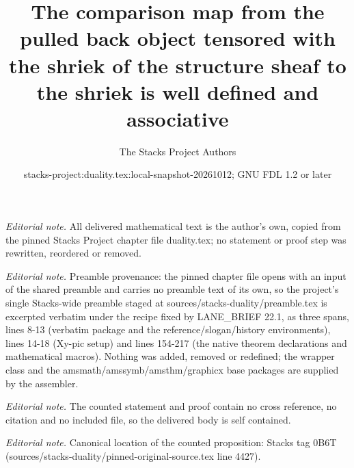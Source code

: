 \documentclass[10pt,a4paper]{amsart}
\title{The comparison map from the pulled back object tensored with the shriek of the structure sheaf to the shriek is well defined and associative}
\author{The Stacks Project Authors}
\date{stacks-project:duality.tex:local-snapshot-20261012; GNU FDL 1.2 or later}
\theoremstyle{plain}
\theoremstyle{definition}
\theoremstyle{remark}
\numberwithin{equation}{subsection}
\begin{document}
\maketitle
\noindent\textit{Editorial note.} All delivered mathematical text is the author's own, copied from the pinned Stacks Project chapter file duality.tex; no statement or proof step was rewritten, reordered or removed.\par\medskip
\noindent\textit{Editorial note.} Preamble provenance: the pinned chapter file opens with an input of the shared preamble and carries no preamble text of its own, so the project's single Stacks-wide preamble staged at sources/stacks-duality/preamble.tex is excerpted verbatim under the recipe fixed by LANE\_BRIEF 22.1, as three spans, lines 8-13 (verbatim package and the reference/slogan/history environments), lines 14-18 (Xy-pic setup) and lines 154-217 (the native theorem declarations and mathematical macros). Nothing was added, removed or redefined; the wrapper class and the amsmath/amssymb/amsthm/graphicx base packages are supplied by the assembler.\par\medskip
\noindent\textit{Editorial note.} The counted statement and proof contain no cross reference, no citation and no included file, so the delivered body is self contained.\par\medskip
\noindent\textit{Editorial note.} Canonical location of the counted proposition: Stacks tag 0B6T (sources/stacks-duality/pinned-original-source.tex line 4427).\par\medskip
\end{document}
